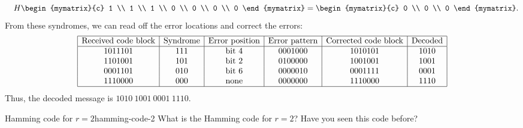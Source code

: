 \begin{solution}
\begin{equation*}
    \quad
    H \begin{mymatrix}{c} 1 \\ 1 \\ 1 \\ 0 \\ 0 \\ 0 \\ 0 \end{mymatrix}
    = \begin{mymatrix}{c} 0 \\ 0 \\ 0 \end{mymatrix}.
  \end{equation*}
  From these syndromes, we can read off the error locations and
  correct the errors:
  \begin{equation*}
    \begin{array}{|c|c|c|c|c|c|}
      \hline
      \mbox{Received code block} &
      \mbox{Syndrome} &
      \mbox{Error position} &
      \mbox{Error pattern} &
      \mbox{Corrected code block} &
      \mbox{Decoded} \\
      \hline
      1011101 & 111 & \mbox{bit 4} & 0001000 & 1010101 & 1010 \\
      1101001 & 101 & \mbox{bit 2} & 0100000 & 1001001 & 1001 \\
      0001101 & 010 & \mbox{bit 6} & 0000010 & 0001111 & 0001 \\
      1110000 & 000 & \mbox{none}  & 0000000 & 1110000 & 1110 \\
      \hline
    \end{array}
  \end{equation*}
  Thus, the decoded message is $1010~1001~0001~1110$.
\end{solution}

\begin{example}{Hamming code for $r=2$}{hamming-code-2}
  What is the Hamming code for $r=2$? Have you seen this code before?
\end{example}

